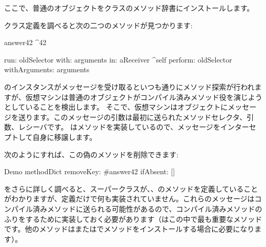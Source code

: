 \documentclass[a4paper,10pt,twoside]{book}
\begin{document}

ここで、普通のオブジェクトをクラスのメソッド辞書にインストールします。


クラス定義を調べると次の二つのメソッドが見つかります:
\begin{code}{}
answer42
	^42

run: oldSelector with: arguments in: aReceiver
	^self perform: oldSelector withArguments: arguments
\end{code}

のインスタンスがメッセージを受け取るといつも通りにメソッド探索が行われますが、仮想マシンは普通のオブジェクトがコンパイル済みメソッド役を演じようとしていることを検出します。
そこで、仮想マシンはオブジェクトにメッセージを送ります。このメッセージの引数は最初に送られたメソッドセレクタ、引数、レシーバです。
はメソッドを実装しているので、メッセージをインターセプトして自身に移譲します。

次のようにすれば、この偽のメソッドを削除できます:
\begin{code}{}
Demo methodDict removeKey: #answer42 ifAbsent: []
\end{code}

をさらに詳しく調べると、スーパークラスが、、のメソッドを定義していることがわかりますが、定義だけで何も実装されていません。これらのメッセージはコンパイル済みメソッドに送られる可能性があるので、コンパイル済みメソッドのふりをするために実装しておく必要があります（はこの中で最も重要なメソッドです。他のメソッドはまたはでメソッドをインストールする場合に必要になります）。

\end{document}
